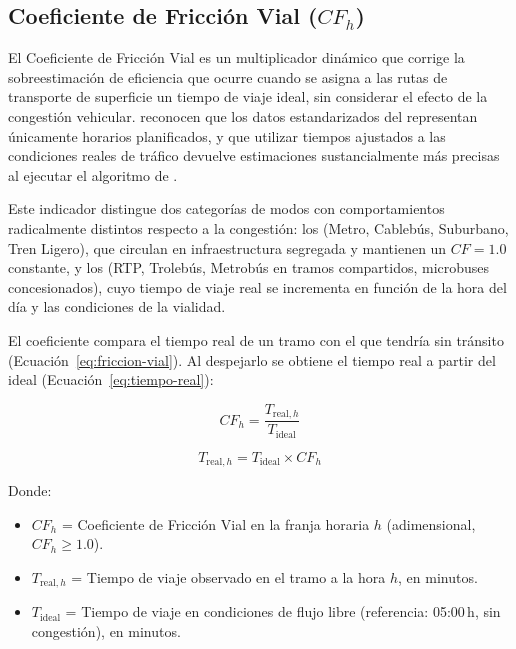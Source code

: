 
\subsection{Coeficiente de Fricción Vial \texorpdfstring{($CF_h$)}{(CFh)}}
\label{subsec:friccion-vial}

El Coeficiente de Fricción Vial es un multiplicador dinámico que corrige la
sobreestimación de eficiencia que ocurre cuando se asigna a las rutas de
transporte de superficie un tiempo de viaje ideal, sin considerar el efecto de
la congestión vehicular. \citet{fortin2016innovative} reconocen que los datos
estandarizados del \gtfs{} representan únicamente horarios planificados, y que
utilizar tiempos ajustados a las condiciones reales de tráfico devuelve
estimaciones sustancialmente más precisas al ejecutar el algoritmo de
\dijkstra{}.

Este indicador distingue dos categorías de modos con comportamientos
radicalmente distintos respecto a la congestión: los 
(Metro, Cablebús, Suburbano, Tren Ligero), que circulan en infraestructura
segregada y mantienen un $CF = 1.0$ constante, y los
 (RTP, Trolebús, Metrobús en tramos compartidos,
microbuses concesionados), cuyo tiempo de viaje real se incrementa en función de
la hora del día y las condiciones de la vialidad.

El coeficiente compara el tiempo real de un tramo con el que tendría sin
tránsito (Ecuación~\eqref{eq:friccion-vial}). Al despejarlo se obtiene el tiempo
real a partir del ideal (Ecuación~\eqref{eq:tiempo-real}):

\begin{equation}
    CF_h = \frac{T_{\text{real},h}}{T_{\text{ideal}}}
    \label{eq:friccion-vial}
\end{equation}

\begin{equation}
    T_{\text{real},h} = T_{\text{ideal}} \times CF_h
    \label{eq:tiempo-real}
\end{equation}

Donde:
\begin{itemize}
    \item $CF_h$ = Coeficiente de Fricción Vial en la franja horaria $h$
    (adimensional, $CF_h \geq 1.0$).
\item $T_{\text{real},h}$ = Tiempo de viaje observado en el tramo a la hora $h$,
    en minutos.
    \item $T_{\text{ideal}}$ = Tiempo de viaje en condiciones de flujo libre
    (referencia: 05:00\,h, sin congestión), en minutos.
\end{itemize}

